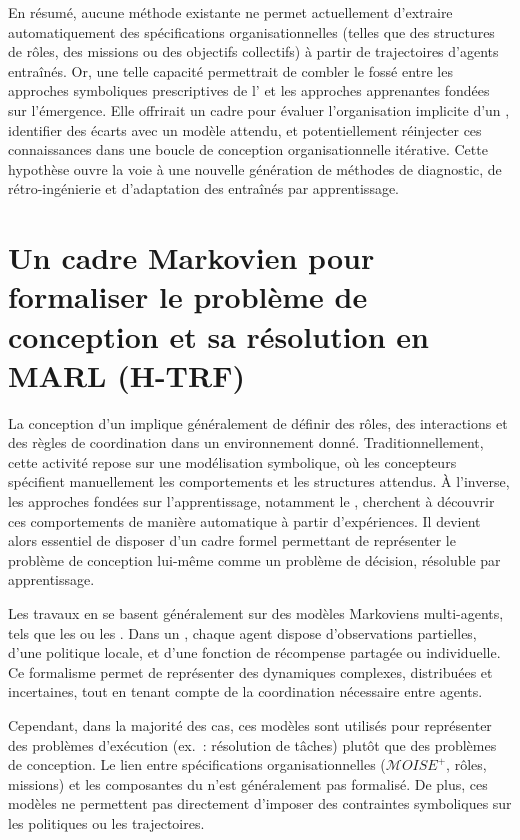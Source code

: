 En résumé, aucune méthode existante ne permet actuellement d'extraire automatiquement des spécifications organisationnelles (telles que des structures de rôles, des missions ou des objectifs collectifs) à partir de trajectoires d'agents entraînés. Or, une telle capacité permettrait de combler le fossé entre les approches symboliques prescriptives de l' et les approches apprenantes fondées sur l'émergence. Elle offrirait un cadre pour évaluer l'organisation implicite d'un , identifier des écarts avec un modèle attendu, et potentiellement réinjecter ces connaissances dans une boucle de conception organisationnelle itérative. Cette hypothèse ouvre la voie à une nouvelle génération de méthodes de diagnostic, de rétro-ingénierie et d'adaptation des  entraînés par apprentissage.


\section{Un cadre Markovien pour formaliser le problème de conception et sa résolution en MARL (H-TRF)}

\noindent
La conception d'un  implique généralement de définir des rôles, des interactions et des règles de coordination dans un environnement donné. Traditionnellement, cette activité repose sur une modélisation symbolique, où les concepteurs spécifient manuellement les comportements et les structures attendus. À l'inverse, les approches fondées sur l'apprentissage, notamment le , cherchent à découvrir ces comportements de manière automatique à partir d'expériences. Il devient alors essentiel de disposer d'un cadre formel permettant de représenter le problème de conception lui-même comme un problème de décision, résoluble par apprentissage.

\medskip

\noindent
Les travaux en  se basent généralement sur des modèles Markoviens multi-agents, tels que les  ou les . Dans un , chaque agent dispose d'observations partielles, d'une politique locale, et d'une fonction de récompense partagée ou individuelle. Ce formalisme permet de représenter des dynamiques complexes, distribuées et incertaines, tout en tenant compte de la coordination nécessaire entre agents.

\noindent
Cependant, dans la majorité des cas, ces modèles sont utilisés pour représenter des problèmes d'exécution (ex.~: résolution de tâches) plutôt que des problèmes de conception. Le lien entre spécifications organisationnelles ($\mathcal{M}OISE^+$, rôles, missions) et les composantes du  n'est généralement pas formalisé. De plus, ces modèles ne permettent pas directement d'imposer des contraintes symboliques sur les politiques ou les trajectoires.

